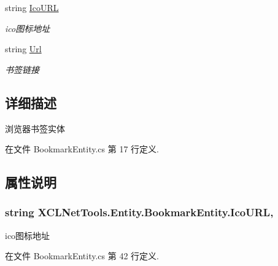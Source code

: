 \begin{DoxyCompactItemize}
string \hyperlink{class_x_c_l_net_tools_1_1_entity_1_1_bookmark_entity_af370dbfd32e8cde501e305c6999c077b}{Ico\+U\+RL}
\begin{DoxyCompactList}\small\item\em ico图标地址 \end{DoxyCompactList}\item 
string \hyperlink{class_x_c_l_net_tools_1_1_entity_1_1_bookmark_entity_a88ebfe2441fd5804a82f5eaee1ce3232}{Url}
\begin{DoxyCompactList}\small\item\em 书签链接 \end{DoxyCompactList}\end{DoxyCompactItemize}


\subsection{详细描述}
浏览器书签实体 



在文件 Bookmark\+Entity.\+cs 第 17 行定义.



\subsection{属性说明}
\subsubsection[{\texorpdfstring{Ico\+U\+RL}{IcoURL}}]{\setlength{\rightskip}{0pt plus 5cm}string X\+C\+L\+Net\+Tools.\+Entity.\+Bookmark\+Entity.\+Ico\+U\+RL\hspace{0.3cm}{\ttfamily [get]}, {\ttfamily [set]}}\hypertarget{class_x_c_l_net_tools_1_1_entity_1_1_bookmark_entity_af370dbfd32e8cde501e305c6999c077b}{}\label{class_x_c_l_net_tools_1_1_entity_1_1_bookmark_entity_af370dbfd32e8cde501e305c6999c077b}


ico图标地址 



在文件 Bookmark\+Entity.\+cs 第 42 行定义.

